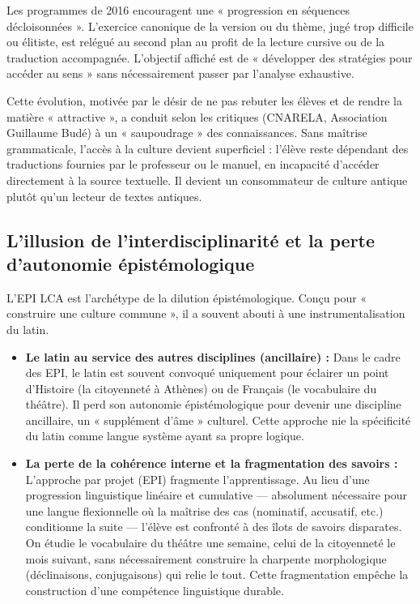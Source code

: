 Les programmes de 2016 encouragent une « progression en séquences décloisonnées ».\cite{I-3-2-ref9}
L'exercice canonique de la version ou du thème, jugé trop difficile ou élitiste, est relégué au
second plan au profit de la lecture cursive ou de la traduction accompagnée. L'objectif affiché est
de « développer des stratégies pour accéder au sens » sans nécessairement passer par l'analyse
exhaustive.\cite{I-3-2-ref13}

Cette évolution, motivée par le désir de ne pas rebuter les élèves et de rendre la matière «
attractive », a conduit selon les critiques (CNARELA, Association Guillaume Budé) à un « saupoudrage
» des connaissances. Sans maîtrise grammaticale, l'accès à la culture devient superficiel : l'élève
reste dépendant des traductions fournies par le professeur ou le manuel, en incapacité d'accéder
directement à la source textuelle. Il devient un consommateur de culture antique plutôt qu'un
lecteur de textes antiques.\cite{I-3-2-ref1}



\subsection{L'illusion de l'interdisciplinarité et la perte d'autonomie épistémologique}

L'EPI LCA est l'archétype de la dilution épistémologique. Conçu pour « construire une culture
commune », il a souvent abouti à une instrumentalisation du latin.

\begin{itemize}\item \textbf{Le latin au service des autres disciplines (ancillaire) :} Dans le cadre des EPI, le latin est souvent convoqué uniquement pour éclairer un point d'Histoire (la citoyenneté à Athènes) ou de Français (le vocabulaire du théâtre). Il perd son autonomie épistémologique pour devenir une discipline ancillaire, un « supplément d'âme » culturel.\cite{I-3-2-ref7} Cette approche nie la spécificité du latin comme langue système ayant sa propre logique.\item \textbf{La perte de la cohérence interne et la fragmentation des savoirs :} L'approche par projet (EPI) fragmente l'apprentissage. Au lieu d'une progression linguistique linéaire et cumulative — absolument nécessaire pour une langue flexionnelle où la maîtrise des cas (nominatif, accusatif, etc.) conditionne la suite — l'élève est confronté à des îlots de savoirs disparates. On étudie le vocabulaire du théâtre une semaine, celui de la citoyenneté le mois suivant, sans nécessairement construire la charpente morphologique (déclinaisons, conjugaisons) qui relie le tout. Cette fragmentation empêche la construction d'une compétence linguistique durable.\end{itemize}

